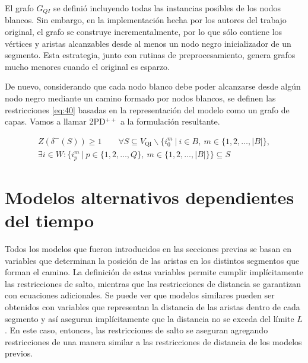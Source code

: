 \documentclass[10pt, a4paper]{article}
\theoremstyle{definition}
\begin{document}
El grafo $G_{QI}$ se definió incluyendo todas las instancias posibles de los nodos blancos. Sin embargo, en la implementación hecha por los autores del trabajo original, el grafo se construye incrementalmente, por lo que sólo contiene los vértices y aristas alcanzables desde al menos un nodo negro inicializador de un segmento. Esta estrategia, junto con rutinas de preprocesamiento, genera grafos mucho menores cuando el original es esparzo.

De nuevo, considerando que cada nodo blanco debe poder alcanzarse desde algún nodo negro mediante un camino formado por nodos blancos, se definen las restricciones \ref{eq:40} basadas en la representación del modelo como un grafo de capas. Vamos a llamar 2PD$^{++}$ a la formulación resultante.

\begin{multline}
	 Z(\delta^{-}(S)) \geq 1 \quad \quad \forall S \subseteq V_{\mathrm{QI}} \backslash\{i_{0}^{m}\ |\ i \in B,\ m \in\{1,2, \ldots,|B|\}, \\
	 \exists i \in W : \{i_{p}^{m}\ |\ p \in \{1,2, \ldots, Q\},\ m \in \{1,2, \ldots,|B|\}\} \subseteq S \label{eq:40}
\end{multline}

\section{Modelos alternativos dependientes del tiempo}

Todos los modelos que fueron introducidos en las secciones previas se basan en variables que determinan la posición de las aristas en los distintos segmentos que forman el camino. La definición de estas variables permite cumplir implícitamente las restricciones de salto, mientras que las restricciones de distancia se garantizan con ecuaciones adicionales. Se puede ver que modelos similares pueden ser obtenidos con variables que representan la distancia de las aristas dentro de cada segmento y así aseguran implícitamente que la distancia no se exceda del límite $L$. En este caso, entonces, las restricciones de salto se aseguran agregando restricciones de una manera similar a las restricciones de distancia de los modelos previos.
\end{document}
